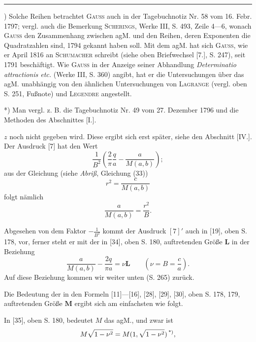 \par\smallskip\noindent\rule{.25\linewidth}{.4pt}\par
{\small
\par\indent *) Solche Reihen betrachtet \textsc{Gauss} auch in der Tagebuchnotiz Nr. 58 vom 16. Febr. 1797; vergl. auch die Bemerkung \textsc{Scherings}, Werke III, S. 493, Zeile 4—6, wonach \textsc{Gauss} den Zusammenhang zwischen agM. und den Reihen, deren Exponenten die Quadratzahlen sind, 1794 gekannt haben soll. Mit dem agM. hat sich \textsc{Gauss}, wie er April 1816 an \textsc{Schumacher} schreibt (siehe oben Briefwechsel [7.], S. 247), seit 1791 beschäftigt. Wie \textsc{Gauss} in der Anzeige seiner Abhandlung \textit{Determinatio attractionis etc.} (Werke III, S. 360) angibt, hat er die Untersuchungen über das agM. unabhängig von den ähnlichen Untersuchungen von \textsc{Lagrange} (vergl. oben S. 251, Fußnote) und \textsc{Legendre} angestellt.
\par\indent **) Man vergl. z. B. die Tagebuchnotiz Nr. 49 vom 27. Dezember 1796 und die Methoden des Abschnittes [I.].
\par}
\clearpage
\fancyhead{}
\noindent $z$ noch nicht gegeben wird. Diese ergibt sich erst später, siehe den Abschnitt [IV.]. Der Ausdruck [7] hat den Wert
\begin{equation*}\tag*{$[7]'$}\frac1{B^2}\left(\frac2\pi\frac qa-\frac{a}{M(a,b)}\right);\end{equation*}
\noindent aus der Gleichung (siehe \textit{Abriß}, Gleichung (33))
\[r^2=\frac{c}{M(a,b)}\]
\noindent folgt nämlich
\[\frac{a}{M(a,b)}=\frac{r^2}{B}.\]
\par\indent Abgesehen von dem Faktor $-\frac1{B^2}$ kommt der Ausdruck $[7]'$ auch in [19], oben S. 178, vor, ferner steht er mit der in [34], oben S. 180, auftretenden Größe $\mathbf L$ in der Beziehung
\begin{equation*}\tag*{$[7]''$}\frac{a}{M(a,b)}-\frac{2q}{\pi a}=\nu\mathbf L\qquad\left(\nu=B=\frac ca\right).\end{equation*}
\noindent Auf diese Beziehung kommen wir weiter unten (S. 265) zurück.
\par\indent Die Bedeutung der in den Formeln [11]—[16], [28], [29], [30], oben S. 178, 179, auftretenden Größe $\mathbf M$ ergibt sich am einfachsten wie folgt.
\par\indent In [35], oben S. 180, bedeutet $M$ das agM., und zwar ist
\[M\sqrt{1-\nu^2}=M(1,\sqrt{1-\nu^2})\,\text{\textsuperscript{*)}},\]
